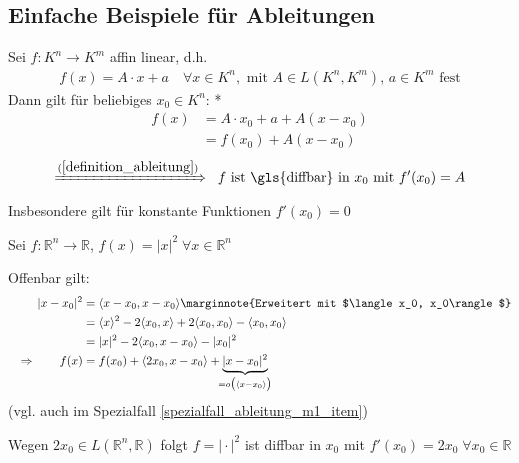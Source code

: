 \subsection*{Einfache Beispiele für Ableitungen}
\begin{example}
	Sei $f:K^n\to K^m$ affin linear, d.h. \begin{align*}
		f(x) = A\cdot x + a\quad \forall x\in K^n, \text{ mit } A\in L(K^n, K^m), \, a\in K^m \text{ fest}
	\end{align*}
	Dann gilt für beliebiges $x_0\in K^n$:
	\zeroAmsmathAlignVSpaces**
	\begin{align*}
		f(x) &= A\cdot x_0 + a + A(x - x_0) \\
		&=f(x_0) + A(x - x_0)
	\end{align*}
	\zeroAmsmathAlignVSpaces
	\begin{align*}
		\xRightarrow{(\ref{definition_ableitung})}\;\; \text{$f$ ist \gls{diffbar} in $x_0$ mit } f'(x_0) = A
	\end{align*}
	Insbesondere gilt für konstante Funktionen $f'(x_0) = 0$
\end{example}
\begin{example}
	Sei $f:\mathbb{R}^n\to \mathbb{R}$, $f(x) = \vert x \vert ^2\;\forall x\in\mathbb{R}^n$
	
	Offenbar gilt:
	\begin{align*}
		&& \vert x - x_0 \vert ^2 &= \langle x - x_0, x - x_0 \rangle \marginnote{Erweitert mit $\langle x_0, x_0\rangle$} \\
		&& &= \langle x \rangle^2 - 2 \langle x_0, x\rangle + 2 \langle x_0, x_0 \rangle - \langle x_0, x_0\rangle \\
		&& &= \vert x \vert ^2 - 2 \langle x_0, x - x_0 \rangle - \vert x_0 \vert ^2 \\
		&&\Rightarrow \qquad f(x) &= f(x_0) + \langle 2x_0, x - x_0 \rangle + \underbrace{\vert x - x_0\vert^2}_{\mathclap{=o\big( \langle x - x_0 \rangle \big)}}
 	\end{align*}
 	(vgl. auch  im Spezialfall \ref{spezialfall_ableitung_m1_item})
 	
 	Wegen $2x_0\in L(\mathbb{R}^n, \mathbb{R})$ folgt $f = \vert \cdot \vert^2$ ist \gls{diffbar} in $x_0$ mit $f'(x_0) = 2 x_0\;\forall x_0\in\mathbb{R}$
\end{example}

